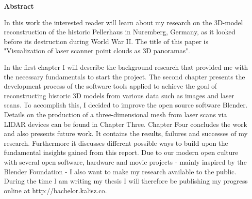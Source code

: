 \thispagestyle{plain}
	\begin{center}
		
		\LARGE
		\textbf{Abstract}
		
	\end{center}


In this work the interested reader will learn about my research on the 3D-model reconstruction of the historic Pellerhaus in Nuremberg, Germany, as it looked before its destruction during World War II. The title of this paper is "Visualization of laser scanner point clouds as 3D panoramas".

In the first chapter I will describe the background research that provided me with the necessary fundamentals to start the project.
The second chapter presents the development process of the software tools applied to achieve the goal of reconstructing historic 3D models from various data such as images and laser scans. To accomplish this, I decided to improve the open source software Blender.
Details on the production of a three-dimensional mesh from laser scans via LIDAR devices can be found in Chapter Three.
Chapter Four concludes the work and also presents future work. It contains the results, failures and successes of my research. Furthermore it discusses different possible ways to build upon the fundamental insights gained from this report.
Due to our modern open culture with several open software, hardware and movie projects - mainly inspired by the Blender Foundation - I also want to make my research available to the public. During the time I am writing my thesis I will therefore be publishing my progress online at http://bachelor.kalisz.co.

\pagebreak